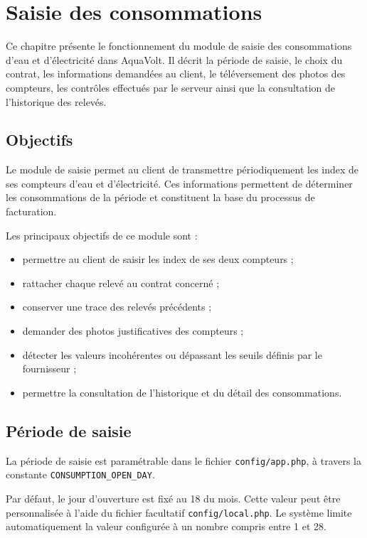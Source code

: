 
\chapter{Saisie des consommations}
\label{chap:consommation}

Ce chapitre présente le fonctionnement du module de saisie des consommations d'eau et d'électricité dans AquaVolt. Il décrit la période de saisie, le choix du contrat, les informations demandées au client, le téléversement des photos des compteurs, les contrôles effectués par le serveur ainsi que la consultation de l'historique des relevés.

\section{Objectifs}

Le module de saisie permet au client de transmettre périodiquement les index de ses compteurs d'eau et d'électricité. Ces informations permettent de déterminer les consommations de la période et constituent la base du processus de facturation.

Les principaux objectifs de ce module sont :
\begin{itemize}
    \item permettre au client de saisir les index de ses deux compteurs ;
    \item rattacher chaque relevé au contrat concerné ;
    \item conserver une trace des relevés précédents ;
    \item demander des photos justificatives des compteurs ;
    \item détecter les valeurs incohérentes ou dépassant les seuils définis par le fournisseur ;
    \item permettre la consultation de l'historique et du détail des consommations.
\end{itemize}

\section{Période de saisie}

La période de saisie est paramétrable dans le fichier \texttt{config/app.php}, à travers la constante \texttt{CONSUMPTION\_OPEN\_DAY}.

Par défaut, le jour d'ouverture est fixé au 18 du mois. Cette valeur peut être personnalisée à l'aide du fichier facultatif \texttt{config/local.php}. Le système limite automatiquement la valeur configurée à un nombre compris entre 1 et 28.

